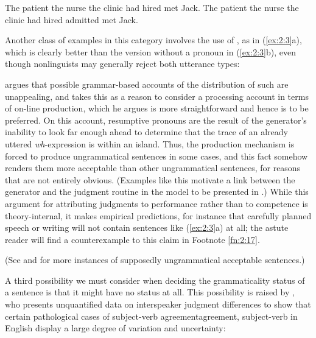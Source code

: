 \ea \label{ex:2:2}
\ea
The patient the nurse the clinic had hired met Jack.
\ex
The patient the nurse the clinic had hired admitted met Jack.
\z
\z

\noindent
Another class of examples in this category involves the use of , as in (\ref{ex:2:3}a), which is clearly better than the version without a pronoun in (\ref{ex:2:3}b), even though nonlinguists may generally reject both utterance types:


\ea\label{ex:2:3}
\z
\z


\noindent
\citet{Kroch1981} argues that possible grammar-based accounts of the distribution of such  are unappealing, and takes this as a reason to consider a processing account in terms of on-line production, which he argues is more straightforward and hence is to be preferred. On this account, resumptive pronouns are the result of the generator's inability to look far enough ahead to determine that the trace of an already uttered \textit{wh}-expression is within an island. Thus, the production mechanism is forced to produce ungrammatical sentences in some cases, and this fact somehow renders them more acceptable than other ungrammatical sentences, for reasons that are not entirely obvious. (Examples like this motivate a link between the generator and the judgment routine in the model to be presented in .) While this argument for attributing judgments to performance rather than to competence is theory-internal, it makes empirical predictions, for instance that carefully planned speech or writing will not contain sentences like (\ref{ex:2:3}a) at all; the astute reader will find a counterexample to this claim in Footnote \ref{fn:2:17}.

(See \citealt{LangendoenEtAl1973} and \citealt{Bever1974} for more instances of supposedly ungrammatical  acceptable sentences.)

A third possibility we must consider when deciding the grammaticality status of a sentence is that it might have no status at all. This possibility is raised by \citet{Morgan1972}, who presents unquantified data on interspeaker judgment differences to show that certain pathological cases of subject-verb agreement{agreement, subject-verb} in English display a large degree of variation and uncertainty:

